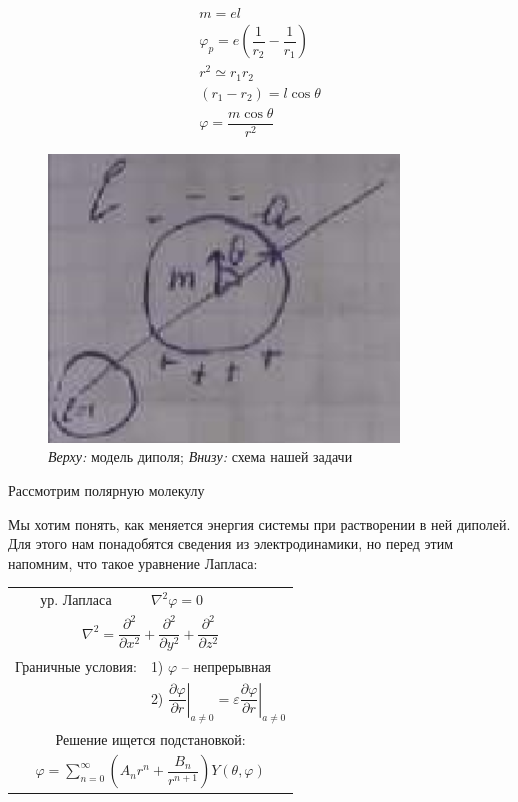 \begin{lecture}
\begin{lecSection}
		\begin{gather*}
			m = e l \\
			\varphi_p = e \left( \dfrac{1}{r_2} - \dfrac{1}{r_1} \right) \\
			r^2 \simeq r_1 r_2 \\
			(r_1 - r_2) = l \cos \theta \\
			\varphi = \dfrac{m \cos \theta}{r^2}
		\end{gather*}
				\begin{figure}
			\centering\includegraphics[width=\linewidth]{lecture_08/polar_sphere}
			\caption{
				\textit{Верху:} модель диполя; 
				\newline \textit{Внизу:} схема нашей задачи
			}
			\label{fig:polar_sphere}
		\end{figure}
		Рассмотрим полярную молекулу
	
		Мы хотим понять, как меняется энергия системы при растворении в ней диполей. Для этого нам понадобятся сведения из электродинамики, но перед этим напомним, что такое уравнение Лапласа:
		
		\begin{tabular}{cl}
			ур. Лапласа & $ \nabla^2 \varphi = 0 $ \\
			\multicolumn{2}{c}{$ \nabla^2 = \dfrac{\partial^2}{\partial x^2} + \dfrac{\partial^2}{\partial y^2} + \dfrac{\partial^2}{\partial z^2} $} \\
			Граничные условия: & 1) $ \varphi $ -- непрерывная \\
							  & 2) $ \left.\dfrac{\partial \varphi}{\partial r} \right|_{a \neq 0} = \varepsilon \left. \dfrac{\partial \varphi}{\partial r} \right|_{a \neq 0} $ \\
			\multicolumn{2}{c}{Решение ищется подстановкой:} \\
			\multicolumn{2}{c}{$ \varphi = \sum\limits_{n=0}^\infty \left( A_n r^n + \dfrac{B_n}{r^{n+1}} \right) Y (\theta, \varphi) $}
		\end{tabular}
		

\end{lecSection}
\end{lecture}
